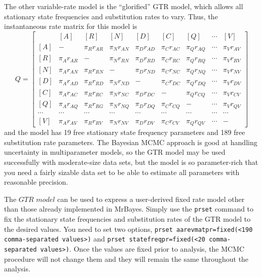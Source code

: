 \documentclass[12pt]{book}
\newcommand{\ttt}[1]{\texttt{#1}}
\begin{document}
The other variable-rate model is the ``glorified'' GTR model, which allows all stationary state
frequencies and substitution rates to vary. Thus, the instantaneous rate matrix for this model is
\footnotesize
\[
Q=\begin{bmatrix}
    & [A] & [R] & [N] & [D] & [C] & [Q] & \cdots & [V]\\
 [A]& - & \pi_{R} r_{AR}& \pi_{N} r_{AN} & \pi_{D} r_{AD}& \pi_{C} r_{AC}& \pi_{Q} r_{AQ} & \cdots & \pi_V r_{AV}\\
 [R]& \pi_{A} r_{AR} &- &  \pi_{N}  r_{RN}& \pi_{D} r_{RD}& \pi_{C} r_{RC}& \pi_{Q} r_{RQ} & \cdots & \pi_V r_{RV}\\
 [N]& \pi_{A} r_{AN}&\pi_{R} r_{RN}&- &   \pi_{D} r_{ND}& \pi_{C} r_{NC}& \pi_{Q} r_{NQ} & \cdots & \pi_V r_{NV}\\
 [D]& \pi_{A} r_{AD} &\pi_{R} r_{RD} &  \pi_{N} r_{ND}&- &  \pi_{C} r_{DC}& \pi_{Q} r_{DQ} & \cdots & \pi_V r_{DV}\\
 [C]& \pi_{A} r_{AC} &\pi_{R} r_{RC} &  \pi_{N} r_{NC}&  \pi_{D} r_{DC}&- & \pi_{Q} r_{CQ} & \cdots & \pi_V r_{CV}\\
 [Q]& \pi_{A} r_{AQ} &\pi_{R} r_{RG} &  \pi_{N} r_{NQ}&  \pi_{D} r_{DQ}& \pi_{C} r_{CQ} &- & \cdots & \pi_V r_{QV}\\
 \cdots& \cdots& \cdots& \cdots& \cdots& \cdots& \cdots& \cdots& \cdots\\
 [V]& \pi_{A} r_{AV} &\pi_{R} r_{RV} &  \pi_{N} r_{NV}&  \pi_{D} r_{DV}& \pi_{C} r_{CV} &\pi_Q r_{QV}& \cdots & -
\end{bmatrix}
\]
\normalsize
and the model has 19 free stationary state frequency parameters and 189 free substitution rate
parameters. The Bayesian MCMC approach is good at handling uncertainty in multiparameter models, so
the GTR model may be used successfully with moderate-size data sets, but the model is so
parameter-rich that you need a fairly sizable data set to be able to estimate all parameters with
reasonable precision.

The $GTR$ $model$ can be used to express a user-derived fixed rate model other than those already
implemented in MrBayes. Simply use the \ttt{prset} command to fix the stationary state frequencies
and substitution rates of the GTR model to the desired values. You need to set two options,
\ttt{prset aarevmatpr=fixed(<190 comma-separated values>)} and \ttt{prset statefreqpr=fixed(<20
comma-separated values>)}. Once the values are fixed prior to analysis, the MCMC procedure will not
change them and they will remain the same throughout the analysis.
\end{document}
